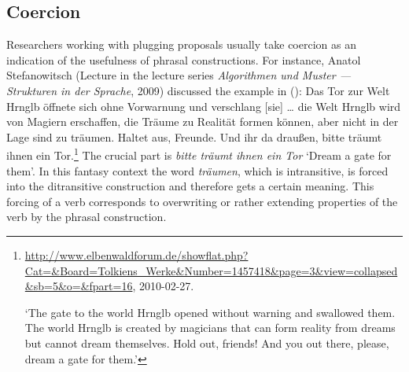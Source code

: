 \largerpage
\subsection{Coercion}
\label{coercion-sec}

Researchers working with plugging proposals usually take coercion as an indication of the usefulness of phrasal
constructions. For instance, Anatol Stefanowitsch (Lecture in the lecture series \emph{Algorithmen und Muster ---
  Strukturen in der Sprache}, 2009) discussed the example in ():
\ea
Das Tor zur Welt Hrnglb öffnete sich ohne Vorwarnung
und verschlang [sie] \ldots{} die Welt Hrnglb wird von Magiern
erschaffen, die Träume zu Realität formen können, aber
nicht in der Lage sind zu träumen. Haltet aus, Freunde.
Und ihr da draußen, bitte träumt ihnen ein Tor.\footnote{%
\url{http://www.elbenwaldforum.de/showflat.php?Cat=&Board=Tolkiens_Werke&Number=1457418&page=3&view=collapsed&sb=5&o=&fpart=16}, 2010-02-27.

`The gate to the world Hrnglb opened without warning and swallowed them. The world Hrnglb is created
by magicians that can form reality from dreams but cannot dream themselves. Hold out, friends! And
you out there, please, dream a gate for them.'
}
\z
The crucial part is \emph{bitte träumt ihnen ein Tor} `Dream a gate for them'. In this fantasy
context the word \emph{träumen}, which is intransitive, is forced into the ditransitive construction
and therefore gets a certain meaning. This forcing of a verb corresponds to overwriting or rather extending properties
of the verb by the phrasal construction.


